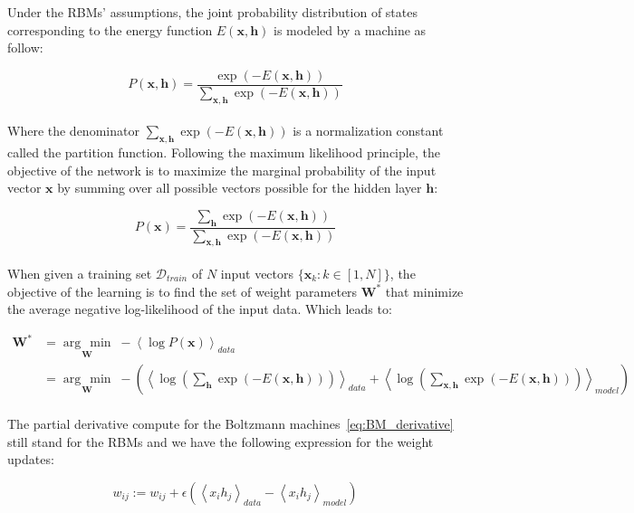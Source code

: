 \documentclass[a4paper,11pt]{report}
\newcommand{\argmin}[1]{\underset{#1}{\operatorname{arg}\,\operatorname{min}}\;}
\begin{document}
		Under the RBMs' assumptions, the joint probability distribution of states corresponding to the energy function $E(\mathbf{x},\mathbf{h})$ is modeled by a machine as follow:
		
		\begin{equation}
			P(\mathbf{x},\mathbf{h}) = \frac{\exp{(-E(\mathbf{x},\mathbf{h}))}}{\sum_{\mathbf{x},\mathbf{h}}{\exp{(-E(\mathbf{x},\mathbf{h}))}}}
		\end{equation}\\
		
		Where the denominator $\sum_{\mathbf{x},\mathbf{h}}{\exp{(-E(\mathbf{x},\mathbf{h}))}}$ is a normalization constant called the partition function. Following the maximum likelihood principle, the objective of the network is to maximize the marginal probability of the input vector $\mathbf{x}$ by summing over all possible vectors possible for the hidden layer $\mathbf{h}$:
		
		\begin{equation}
			P(\mathbf{x}) = \frac{\sum_{\mathbf{h}}{\exp{(-E(\mathbf{x},\mathbf{h}))}}}{\sum_{\mathbf{x},\mathbf{h}}{\exp{(-E(\mathbf{x},\mathbf{h}))}}}
		\end{equation}\\
		
		When given a training set $\mathcal{D}_{train}$ of $N$ input vectors $\{\mathbf{x}_{k}: k \in [1, N]\}$, the objective of the learning is to find the set of weight parameters $\mathbf{W^{\ast}}$ that minimize the average negative log-likelihood of the input data. Which leads to:
		
		\begin{equation}
			\begin{split}
				\mathbf{W^{\ast}}	&= \argmin{\mathbf{W}} - \left\langle \log P(\mathbf{x}) \right\rangle_{data}\\
												&= \argmin{\mathbf{W}} - \left( \left\langle  \log \left(\sum_{\mathbf{h}}\exp(-E(\mathbf{x},\mathbf{h})) \right) \right\rangle_{data} 
														+ \left\langle  \log \left(\sum_{\mathbf{x,h}}\exp(-E(\mathbf{x},\mathbf{h})) \right) \right\rangle_{model} \right)
			\end{split}
		\end{equation}\\
		
		The partial derivative compute for the Boltzmann machines~\ref{eq:BM_derivative} still stand for the RBMs and we have the following expression for the weight updates:
		
		\begin{equation}
			w_{ij} := w_{ij} + \epsilon \left( \left\langle x_{i}h_{j} \right\rangle_{data} - \left\langle x_{i}h_{j} \right\rangle_{model} \right)
			\label{eq:RBM weight update}
		\end{equation}\\
		
\end{document}
